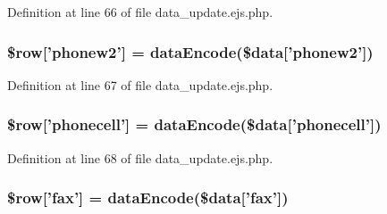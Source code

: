 \-Definition at line 66 of file data\-\_\-update.\-ejs.\-php.

\hypertarget{miscellaneous_2mysettings_2data__update_8ejs_8php_ac8ae8c92d60ba675fbaeda33916b1ecb}{
\subsubsection[{\$row}]{\setlength{\rightskip}{0pt plus 5cm}\$row\mbox{[}'phonew2'\mbox{]} = {\bf data\-Encode}(\$data\mbox{[}'phonew2'\mbox{]})}}\label{miscellaneous_2mysettings_2data__update_8ejs_8php_ac8ae8c92d60ba675fbaeda33916b1ecb}


\-Definition at line 67 of file data\-\_\-update.\-ejs.\-php.

\hypertarget{miscellaneous_2mysettings_2data__update_8ejs_8php_a0517e1ea0f1ef22772f36b37a743d1be}{
\subsubsection[{\$row}]{\setlength{\rightskip}{0pt plus 5cm}\$row\mbox{[}'phonecell'\mbox{]} = {\bf data\-Encode}(\$data\mbox{[}'phonecell'\mbox{]})}}\label{miscellaneous_2mysettings_2data__update_8ejs_8php_a0517e1ea0f1ef22772f36b37a743d1be}


\-Definition at line 68 of file data\-\_\-update.\-ejs.\-php.

\hypertarget{miscellaneous_2mysettings_2data__update_8ejs_8php_addcf6434ea14720a2fb19d21dc55a8c9}{
\subsubsection[{\$row}]{\setlength{\rightskip}{0pt plus 5cm}\$row\mbox{[}'fax'\mbox{]} = {\bf data\-Encode}(\$data\mbox{[}'fax'\mbox{]})}}\label{miscellaneous_2mysettings_2data__update_8ejs_8php_addcf6434ea14720a2fb19d21dc55a8c9}



